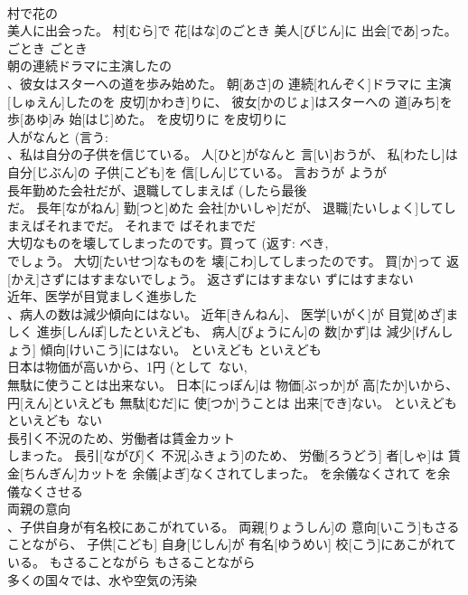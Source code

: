 \documentclass[8pt]{extreport}
\begin{document}
\begin{CJK}{UTF8}{min}
\\	村で花の 
\\	美人に出会った。	村[むら]で 花[はな]のごとき 美人[びじん]に 出会[であ]った。	ごとき	ごとき	
\\	朝の連続ドラマに主演したの 
\\	、彼女はスターへの道を歩み始めた。	朝[あさ]の 連続[れんぞく]ドラマに 主演[しゅえん]したのを 皮切[かわき]りに、 彼女[かのじょ]はスターへの 道[みち]を 歩[あゆ]み 始[はじ]めた。	を皮切りに	を皮切りに	
\\	人がなんと (言う: 
\\	、私は自分の子供を信じている。	人[ひと]がなんと 言[い]おうが、 私[わたし]は 自分[じぶん]の 子供[こども]を 信[しん]じている。	言おうが	ようが	
\\	長年勤めた会社だが、退職してしまえば (したら最後~ 
\\	だ。	長年[ながねん] 勤[つと]めた 会社[かいしゃ]だが、 退職[たいしょく]してしまえばそれまでだ。	それまで	ばそれまでだ	
\\	大切なものを壊してしまったのです。買って (返す: べき, 
\\	でしょう。	大切[たいせつ]なものを 壊[こわ]してしまったのです。 買[か]って 返[かえ]さずにはすまないでしょう。	返さずにはすまない	ずにはすまない	
\\	近年、医学が目覚ましく進歩した 
\\	、病人の数は減少傾向にはない。	近年[きんねん]、 医学[いがく]が 目覚[めざ]ましく 進歩[しんぽ]したといえども、 病人[びょうにん]の 数[かず]は 減少[げんしょう] 傾向[けいこう]にはない。	といえども	といえども	
\\	日本は物価が高いから、1円 (として~ない, 
\\	無駄に使うことは出来ない。	日本[にっぽん]は 物価[ぶっか]が 高[たか]いから、 
\\	円[えん]といえども 無駄[むだ]に 使[つか]うことは 出来[でき]ない。	といえども	といえども~ない	
\\	長引く不況のため、労働者は賃金カット 
\\	しまった。	長引[ながび]く 不況[ふきょう]のため、 労働[ろうどう] 者[しゃ]は 賃金[ちんぎん]カットを 余儀[よぎ]なくされてしまった。	を余儀なくされて	を余儀なくさせる	
\\	両親の意向 
\\	、子供自身が有名校にあこがれている。	両親[りょうしん]の 意向[いこう]もさることながら、 子供[こども] 自身[じしん]が 有名[ゆうめい] 校[こう]にあこがれている。	もさることながら	もさることながら	
\\	多くの国々では、水や空気の汚染 

\end{CJK}
\end{document}
